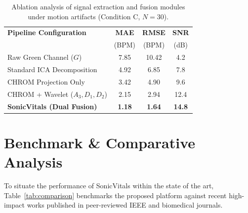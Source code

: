 \documentclass[journal]{IEEEtran}
\begin{document}
\begin{table}[!t]
    \centering
    \caption{Ablation analysis of signal extraction and fusion modules under motion artifacts (Condition C, $N=30$).}
    \label{tab:ablation}
    \footnotesize
    \renewcommand{\arraystretch}{0.92}
    \setlength{\tabcolsep}{2.2pt}
    \begin{tabular}{lccc}
        \toprule
        \textbf{Pipeline Configuration} & \textbf{MAE} & \textbf{RMSE} & \textbf{SNR} \\
        & (BPM) & (BPM) & (dB) \\
        \midrule
        Raw Green Channel ($G$) & 7.85 & 10.42 & 4.2 \\
        Standard ICA Decomposition & 4.92 & 6.85 & 7.8 \\
        CHROM Projection Only & 3.42 & 4.90 & 9.6 \\
        CHROM + Wavelet ($A_3, D_1, D_2$) & 2.15 & 2.94 & 12.4 \\
        \textbf{SonicVitals (Dual Fusion)} & \textbf{1.18} & \textbf{1.64} & \textbf{14.8} \\
        \bottomrule
    \end{tabular}
\end{table}

\section{Benchmark \& Comparative Analysis}

To situate the performance of SonicVitals within the state of the art, Table~\ref{tab:comparison} benchmarks the proposed platform against recent high-impact works published in peer-reviewed IEEE and biomedical journals.
\end{document}
